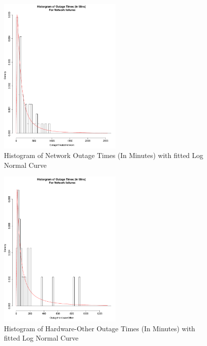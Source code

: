 \documentclass[conference]{IEEEtran}
\begin{document}
\begin{figure}
\begin{center}
\includegraphics[width=6cm]{graph9.pdf} 
\caption{ Histogram of Network Outage Times (In Minutes) with fitted Log Normal Curve}
\end{center}
\label{fig:outagedistribution}
\end{figure}

\begin{figure}
\begin{center}
\includegraphics[width=6cm]{graph10.pdf} 
\caption{ Histogram of Hardware-Other Outage Times (In Minutes) with fitted Log Normal Curve}
\end{center}
\label{fig:outagedistribution}
\end{figure}
\end{document}
